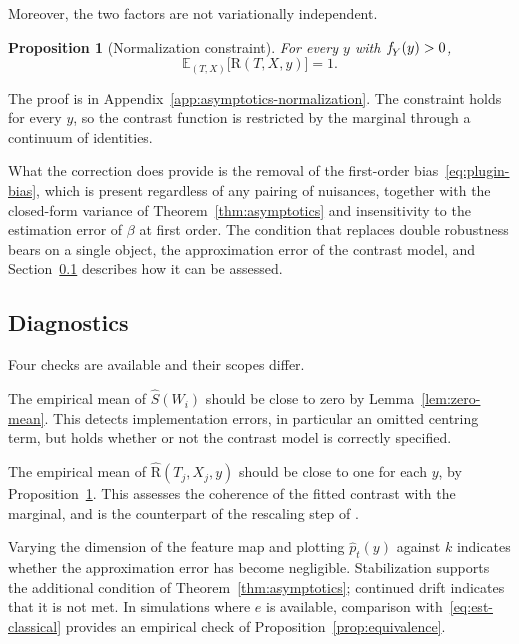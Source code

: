\documentclass[11pt]{article}
\theoremstyle{plain}
\newtheorem{mypropo}{Proposition}
\theoremstyle{definition}
\theoremstyle{remark}
\newcommand{\pE}{\ensuremath{\mathbb{E}}}
\newcommand{\pf}[1]{\ensuremath{\,\mathlarger{\textit{f}}_{#1}}}
\newcommand{\DensityRatio}{\text{R}}
\newcommand{\ks}{k}
\newcommand{\gps}{e}
\newcommand{\score}{S}
\begin{document}
Moreover, the two factors are not variationally independent.

\begin{mypropo}[Normalization constraint]
\label{prop:normalization}
For every $y$ with $\pf{Y}(y) > 0$,
\begin{equation}
\pE_{(T,X)}\big[ \DensityRatio(T,X,y) \big] = 1 .
\label{eq:normalization}
\end{equation}
\end{mypropo}

The proof is in Appendix~\ref{app:asymptotics-normalization}. The constraint holds for
every $y$, so the contrast function is restricted by the marginal through a continuum of
identities.

What the correction does provide is the removal of the first-order
bias~\eqref{eq:plugin-bias}, which is present regardless of any pairing of nuisances,
together with the closed-form variance of Theorem~\ref{thm:asymptotics} and insensitivity
to the estimation error of $\beta$ at first order. The condition that replaces double
robustness bears on a single object, the approximation error of the contrast model, and
Section~\ref{sec:discussion-diagnostics} describes how it can be assessed.

\subsection{Diagnostics}
\label{sec:discussion-diagnostics}

Four checks are available and their scopes differ.

The empirical mean of $\widehat\score(W_i)$ should be close to zero by
Lemma~\ref{lem:zero-mean}. This detects implementation errors, in particular an omitted
centring term, but holds whether or not the contrast model is correctly specified.

The empirical mean of $\widehat{\DensityRatio}(T_j,X_j,y)$ should be close to one for
each $y$, by Proposition~\ref{prop:normalization}. This assesses the coherence of the
fitted contrast with the marginal, and is the counterpart of the rescaling step of
\citet{meziani2025mcd}.

Varying the dimension of the feature map and plotting $\widehat p_t(y)$ against $\ks$
indicates whether the approximation error has become negligible. Stabilization supports
the additional condition of Theorem~\ref{thm:asymptotics}; continued drift indicates that
it is not met. In simulations where $\gps$ is available, comparison
with~\eqref{eq:est-classical} provides an empirical check of
Proposition~\ref{prop:equivalence}.
\end{document}
